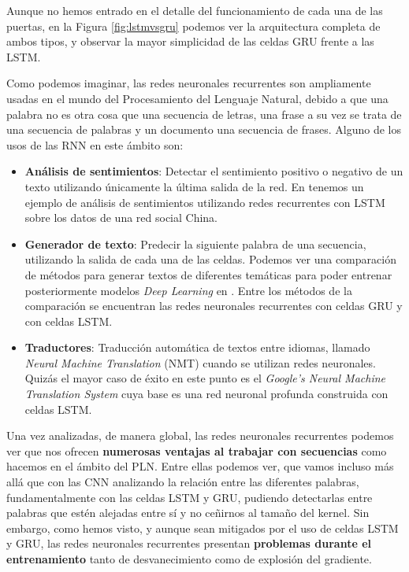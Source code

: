 Aunque no hemos entrado en el detalle del funcionamiento de cada una de las puertas, en la Figura \ref{fig:lstmvsgru} podemos ver la arquitectura completa de ambos tipos, y observar la mayor simplicidad de las celdas GRU frente a las LSTM. 


Como podemos imaginar, las redes neuronales recurrentes son ampliamente usadas en el mundo del Procesamiento del Lenguaje Natural, debido a que una palabra no es otra cosa que una secuencia de letras, una frase a su vez se trata de una secuencia de palabras y un documento una secuencia de frases. Alguno de los usos de las RNN en este ámbito son: 

\begin{itemize}
	\item \textbf{Análisis de sentimientos}: Detectar el sentimiento positivo o negativo de un texto utilizando únicamente la última salida de la red. En \cite{rnnej1} tenemos un ejemplo de análisis de sentimientos utilizando redes recurrentes con LSTM sobre los datos de una red social China.
	\item \textbf{Generador de texto}: Predecir la siguiente palabra de una secuencia, utilizando la salida de cada una de las celdas. Podemos ver una comparación de métodos para generar textos de diferentes temáticas para poder entrenar posteriormente modelos \textit{Deep Learning} en \cite{rnnej2}. Entre los métodos de la comparación se encuentran las redes neuronales recurrentes con celdas GRU y con celdas LSTM.
	\item \textbf{Traductores}: Traducción automática de textos entre idiomas, llamado \textit{Neural Machine Translation} (NMT) cuando se utilizan redes neuronales.  Quizás el mayor caso de éxito en este punto es el \textit{Google's Neural Machine Translation System} \cite{rnnej3} cuya base es una red neuronal profunda construida con celdas LSTM.
\end{itemize}



Una vez analizadas, de manera global, las redes neuronales recurrentes podemos ver que nos ofrecen \textbf{numerosas ventajas al trabajar con secuencias} como hacemos en el ámbito del PLN. Entre ellas podemos ver, que vamos incluso más allá que con las CNN analizando la relación entre las diferentes palabras, fundamentalmente con las celdas LSTM y GRU, pudiendo detectarlas entre palabras que estén alejadas entre sí y no ceñirnos al tamaño del kernel. Sin embargo, como hemos visto, y aunque sean mitigados por el uso de celdas LSTM y GRU, las redes neuronales recurrentes presentan \textbf{problemas durante el entrenamiento} tanto de desvanecimiento como de explosión del gradiente.


